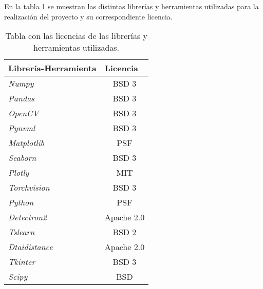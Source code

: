 En la tabla \ref{tablaA5} se muestran las distintas librerías y herramientas utilizadas para la realización del proyecto y su correspondiente licencia. 

\begin{table}[H]
\centering
\begin{tabular}{lc}
\hline
\rowcolor[HTML]{EFEFEF} 
\textbf{Librería-Herramienta} & \multicolumn{1}{l}{\cellcolor[HTML]{EFEFEF}\textbf{Licencia}} \\ \hline
\rowcolor[HTML]{ECF4FF} 
\textit{Numpy}                & BSD 3                                                         \\
\rowcolor[HTML]{EFEFEF} 
\textit{Pandas}               & BSD 3                                                         \\
\rowcolor[HTML]{ECF4FF} 
\textit{OpenCV}               & BSD 3                                                         \\
\rowcolor[HTML]{EFEFEF} 
\textit{Pynvml}               & BSD 3                                                         \\
\rowcolor[HTML]{ECF4FF} 
\textit{Matplotlib}           & PSF                                                           \\
\rowcolor[HTML]{EFEFEF} 
\textit{Seaborn}              & BSD 3                                                \\
\rowcolor[HTML]{ECF4FF} 
\textit{Plotly}               & MIT                                                           \\
\rowcolor[HTML]{EFEFEF} 
\textit{Torchvision}          & BSD 3                                                         \\
\rowcolor[HTML]{ECF4FF} 
\textit{Python}               & PSF                                                           \\
\rowcolor[HTML]{EFEFEF} 
\textit{Detectron2}           & Apache 2.0                                                    \\
\rowcolor[HTML]{ECF4FF} 
\textit{Tslearn}              & BSD 2                                                         \\
\rowcolor[HTML]{EFEFEF} 
\textit{Dtaidistance}         & \multicolumn{1}{l}{\cellcolor[HTML]{EFEFEF}Apache 2.0}        \\
\rowcolor[HTML]{ECF4FF} 
\textit{Tkinter}              & BSD 3                                                         \\
\rowcolor[HTML]{EFEFEF} 
\textit{Scipy}                & BSD                                                           \\ \hline
\end{tabular}
\caption{Tabla con las licencias de las librerías y herramientas utilizadas.}
\label{tablaA5}
\end{table}

